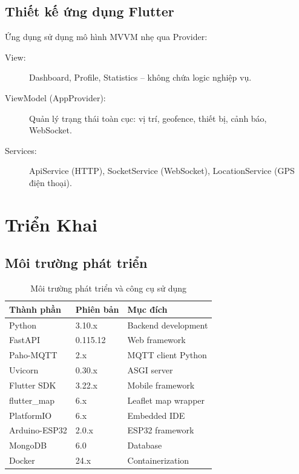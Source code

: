 \documentclass[13pt, a4paper]{report}
\begin{document}
\section{Thiết kế ứng dụng Flutter}

Ứng dụng sử dụng mô hình MVVM nhẹ qua Provider:
\begin{description}
  \item[View:] Dashboard, Profile, Statistics -- không chứa logic nghiệp vụ.
  \item[ViewModel (AppProvider):] Quản lý trạng thái toàn cục: vị trí, geofence, thiết bị, cảnh báo, WebSocket.
  \item[Services:] ApiService (HTTP), SocketService (WebSocket), LocationService (GPS điện thoại).
\end{description}

\chapter{Triển Khai}

\section{Môi trường phát triển}

\begin{table}[H]
\centering
\caption{Môi trường phát triển và công cụ sử dụng}
\label{tab:dev_env}
\begin{tabularx}{\textwidth}{l l X}
\toprule
\textbf{Thành phần} & \textbf{Phiên bản} & \textbf{Mục đích} \\
\midrule
Python        & 3.10.x    & Backend development \\
FastAPI       & 0.115.12  & Web framework \\
Paho-MQTT     & 2.x       & MQTT client Python \\
Uvicorn       & 0.30.x    & ASGI server \\
\midrule
Flutter SDK   & 3.22.x    & Mobile framework \\
flutter\_map  & 6.x       & Leaflet map wrapper \\
\midrule
PlatformIO    & 6.x       & Embedded IDE \\
Arduino-ESP32 & 2.0.x     & ESP32 framework \\
\midrule
MongoDB       & 6.0       & Database \\
Docker        & 24.x      & Containerization \\
\bottomrule
\end{tabularx}
\end{table}
\end{document}
